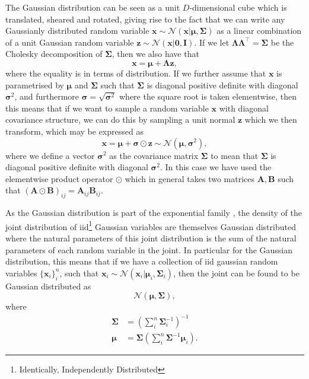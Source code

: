The Gaussian distribution can be seen as a unit $D$-dimensional cube which is
translated, sheared and rotated, giving rise to the fact that we can write any
Gaussianly distributed random variable $\bm{x} \sim \mathcal{N}(\bm{x} |
\bm{\mu}, \bm{\Sigma})$ as a linear combination of a unit Gaussian random
variable $\bm{z} \sim \mathcal{N}(\bm{x} | \bm{0}, \bm{I})$. If
we let $\bm{\Lambda} \bm{\Lambda}^{\top} = \bm{\Sigma}$ be the Cholesky
decomposition \cite[p.~100-102]{Press:2007:NRE:1403886} of $\bm{\Sigma}$, then we
also have that
\begin{equation}
  \label{eq:sample_x}
  \bm{x} = \bm{\mu} + \bm{\Lambda}\bm{z},
\end{equation}
where the equality is in terms of distribution. If we further assume that
$\bm{x}$ is parametrised by $\bm{\mu}$ and $\bm{\Sigma}$ such that $\bm{\Sigma}$
is diagonal positive definite with diagonal $\bm{\sigma}^2$, and furthermore
$\bm{\sigma} = \sqrt{\bm{\sigma}^2}$ where the square root is taken elementwise, then this means that if we want to
sample a random variable $\bm{x}$ with diagonal covariance structure, we
can do this by sampling a unit normal $\bm{z}$ which we then transform, which
may be expressed as
\begin{equation}
  \label{eq:sample_x_diag_covariance}
  \bm{x} = \bm{\mu} + \bm{\sigma} \odot \bm{z} \sim \mathcal{N}(\bm{\mu}, \bm{\sigma}^2),
\end{equation}
where we define a vector $\bm{\sigma}^2$ as the covariance matrix $\bm{\Sigma}$ to
mean that $\bm{\Sigma}$ is diagonal positive definite with diagonal
$\bm{\sigma}^2$. In this case we have used the elementwise product operator
$\odot$ which in general takes two matrices $\bm{A}, \bm{B}$ such that $(\bm{A}
\odot \bm{B})_{ij} = \bm{A}_{ij} \bm{B}_{ij}$.

As the Gaussian distribution is part of the exponential
family \cite{Barber:2012:BRM:2207809}, the density of the joint distribution of
iid\footnote{Identically, Independently Distributed} Gaussian variables are themselves Gaussian distributed where the natural
parameters of this joint distribution is the sum of the natural parameters of
each random variable in the joint. In particular for the Gaussian distribution,
this means that if we have a collection of iid gaussian random variables
$\{\bm{x}_i\}_i^n$, such that $\bm{x}_i \sim \mathcal{N}(\bm{x}_i | \bm{\mu}_i,
\bm{\Sigma}_{i})$, then the joint can be found to be Gaussian distributed as
\begin{equation*}
  \mathcal{N}(\bm{\mu}, \bm{\Sigma}),
\end{equation*}
where
\begin{align}
  \bm{\Sigma} & = \left( \sum_i^n \bm{\Sigma}_i^{-1} \right)^{-1} \label{eq:joint_indep_normal_covariance}\\ 
  \bm{\mu} & = \bm{\Sigma}\left( \sum_i^n \bm{\Sigma}^{-1} \bm{\mu}_i \right) \label{eq:joint_indep_normal_mean}.
\end{align}\cite[p.~78-84]{Bishop:2006}


